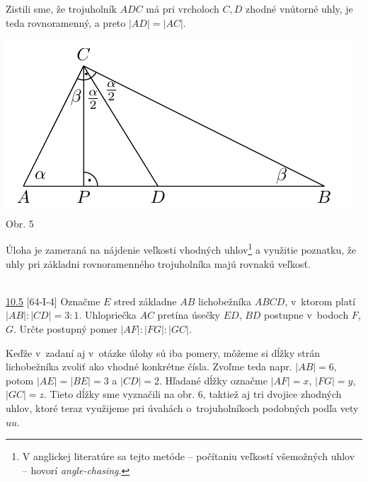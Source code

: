 Zistili sme, že trojuholník $ADC$ má pri vrcholoch $C, D$ zhodné vnútorné uhly, je
teda rovnoramenný, a preto $|AD| = |AC|$.
\begin{center}
\includegraphics{obrazky/58S21}\\

Obr. 5
\end{center}
\kom Úloha je zameraná na nájdenie veľkosti vhodných uhlov\footnote{V anglickej literatúre sa tejto metóde -- počítaniu veľkostí všemožných uhlov -- hovorí \textit{angle-chasing}.} a využitie poznatku, že uhly pri základni rovnoramenného trojuholníka majú rovnakú veľkosť.\\
\\
\begin{tcolorbox}[breakable,notitle,boxrule=0pt,colback=light-gray,colframe=light-gray]\ul{10.5} [64-I-4] Označme $E$ stred základne $AB$ lichobežníka $ABCD$, v~ktorom platí $|AB| : |CD| = 3 : 1$. Uhlopriečka $AC$ pretína úsečky $ED$, $BD$ postupne v~bodoch $F$, $G$. Určte postupný pomer $|AF| : |FG| : |GC|$.

\end{tcolorbox}

\rieh  Keďže v~zadaní aj v~otázke úlohy sú iba pomery, môžeme si dĺžky strán lichobežníka zvoliť ako vhodné konkrétne čísla. Zvoľme teda napr. $|AB| = 6$, potom $|AE| = |BE| = 3$ a $|CD| = 2$. Hľadané dĺžky označme $|AF| = x$, $|FG| = y$, $|GC| = z$. Tieto dĺžky sme vyznačili na obr. 6, taktiež aj tri dvojice zhodných uhlov, ktoré teraz využijeme pri úvahách o~trojuholníkoch podobných podľa vety $uu$.

